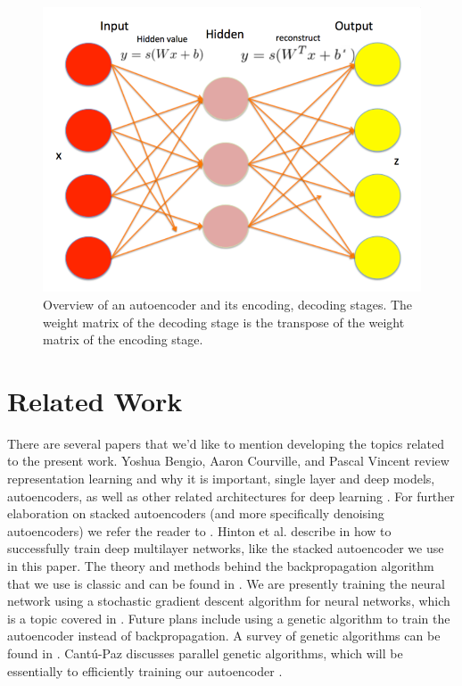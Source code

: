 \documentclass[conference]{IEEEtran}
\begin{document}
\begin{figure}[h]
\centering
\includegraphics[width=0.9\linewidth]{autoencoder.png}
\caption{Overview of an autoencoder and its encoding, decoding stages. The weight matrix of the decoding stage is the transpose of the weight matrix of the encoding stage.}
\label{fig:autoencoder}
\end{figure}

\section{Related Work}
There are several papers that we'd like to mention developing the topics related to the present work. Yoshua Bengio, Aaron Courville, and Pascal Vincent review representation learning and why it is important,
single layer and deep models, autoencoders, as well as other related architectures for deep learning \cite{bengio2012rep}. For further elaboration on stacked autoencoders (and more specifically denoising autoencoders)
we refer the reader to \cite{vincent2010stacked}. Hinton et al. describe in \cite{hinton2006learning} how to successfully train deep multilayer networks, like the stacked autoencoder we use in this paper. The theory and methods behind the backpropagation algorithm that we use
is classic and can be found in \cite{hecht1989theory}. We are presently training the neural network using a stochastic gradient descent algorithm for neural networks, which is a topic covered in \cite{bottou-91c}.
Future plans include using a genetic algorithm to train the autoencoder instead of backpropagation. A survey of genetic algorithms can be found in \cite{srinivas1994genetic}.
Cant{\'u}-Paz discusses parallel genetic algorithms, which will be essentially to efficiently training our autoencoder \cite{cantu1998survey}.
\end{document}
